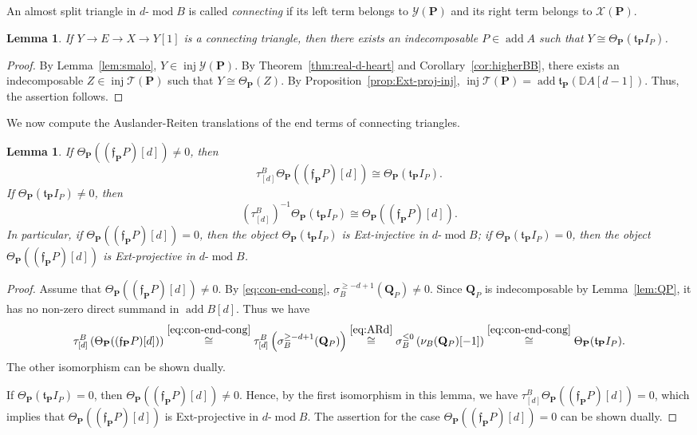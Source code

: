 \documentclass[11pt,a4paper,reqno]{amsart}
\theoremstyle{plain}
\newtheorem{lemma}[theorem]{Lemma}
\numberwithin{equation}{section}
\theoremstyle{definition}
\providecommand{\add}{\operatorname{add}}
\renewcommand{\mod}{\operatorname{mod}}
\newcommand{\Inj}{\operatorname{inj}}
\newcommand{\emod}[2]{#1\text{-}\!\mod #2}
\newcommand{\PP}{\mathbf{P}}
\newcommand{\QQ}{\mathbf{Q}}
\newcommand{\T}{\mathcal{T}}
\newcommand{\X}{\mathcal{X}}
\newcommand{\Y}{\mathcal{Y}}
\begin{document}
An almost split triangle in $\emod{d}{B}$ is called \emph{connecting} if its left term belongs to $\Y(\PP)$ and its right term belongs to $\X(\PP)$.

\begin{lemma}\label{lem:connecting1}
  If $Y\to E\to X\to Y[1]$ is a connecting triangle, then there exists an indecomposable $P\in\add A$ such that $Y\cong\Theta_{\PP}(\mathfrak{t}_{\PP}I_P)$.
\end{lemma}

\begin{proof}
By Lemma~\ref{lem:smalo}, $Y\in\Inj\Y(\PP)$. By Theorem~\ref{thm:real-d-heart} and Corollary~\ref{cor:higherBB}, there exists an indecomposable $Z\in\Inj\T(\PP)$ such that $Y\cong\Theta_{\PP}(Z)$. By Proposition~\ref{prop:Ext-proj-inj}, $\Inj\T(\PP)=\add\mathfrak{t}_{\PP}(\mathbb D A[d-1])$. Thus, the assertion follows.
\end{proof}

We now compute the Auslander-Reiten translations of the end terms
of connecting triangles.

\begin{lemma}\label{lem:connecting2}
If $\Theta_{\PP}((\mathfrak{f}_{\PP}P)[d])\neq 0$, then
\[
 \tau^B_{[d]}\Theta_{\PP}((\mathfrak{f}_{\PP}P)[d])\cong \Theta_{\PP}(\mathfrak{t}_{\PP}I_P).
\]
If $\Theta_{\PP}(\mathfrak{t}_{\PP}I_P)\neq 0$, then
\[
 (\tau^B_{[d]})^{-1}\Theta_{\PP}(\mathfrak{t}_{\PP}I_P)\cong\Theta_{\PP}((\mathfrak{f}_{\PP}P)[d]).
\]
In particular, if $\Theta_{\PP}((\mathfrak{f}_{\PP}P)[d])=0$, then the object $\Theta_{\PP}(\mathfrak{t}_{\PP}I_P)$ is Ext-injective in $\emod{d}{B}$;
if $\Theta_{\PP}(\mathfrak{t}_{\PP}I_P)=0$, then the object $\Theta_{\PP}((\mathfrak{f}_{\PP}P)[d])$ is Ext-projective in $\emod{d}{B}$.
\end{lemma}

\begin{proof}
  Assume that $\Theta_{\PP}((\mathfrak{f}_{\PP}P)[d])\neq0$. By \eqref{eq:con-end-cong}, $\sigma_B^{\geq-d+1}(\QQ_P)\neq0$. Since $\QQ_P$ is indecomposable by Lemma~\ref{lem:QP}, it has no non-zero direct summand in $\add B[d]$. Thus we have
  \[\tau^B_{[d]}\left(\Theta_{\PP}((\mathfrak{f}_{\PP}P)[d])\right)\overset{\eqref{eq:con-end-cong}}{\cong}\tau^B_{[d]}\left(\sigma_B^{\geq-d+1}(\QQ_P)\right)\overset{\eqref{eq:ARd}}{\cong}\sigma_B^{\leq0}\left(\nu_B(\QQ_P)[-1]\right)\overset{\eqref{eq:con-end-cong}}{\cong}\Theta_{\PP}(\mathfrak{t}_{\PP}I_P).\]
  The other isomorphism can be shown dually.

  If $\Theta_{\PP}(\mathfrak{t}_{\PP}I_P)=0$, then $\Theta_{\PP}((\mathfrak{f}_{\PP}P)[d])\neq 0$. Hence, by the first isomorphism in this lemma, we have $\tau^B_{[d]}\Theta_{\PP}((\mathfrak{f}_{\PP}P)[d])=0$, which implies that  $\Theta_{\PP}((\mathfrak{f}_{\PP}P)[d])$ is Ext-projective in $\emod{d}{B}$. The assertion for the case $\Theta_{\PP}((\mathfrak{f}_{\PP}P)[d])=0$ can be shown dually.
\end{proof}
\end{document}
